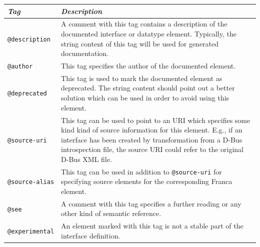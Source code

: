 \documentclass[a4paper,10pt]{scrreprt}
\newlength{\XdocTEffectiveWidth}
\begin{document}
\begin{table}
\setlength{\XdocTEffectiveWidth}{\textwidth}
\addtolength{\XdocTEffectiveWidth}{-4.0\tabcolsep}
\noindent\begin{tabular}{p{0.22\XdocTEffectiveWidth}p{0.78\XdocTEffectiveWidth}}
\toprule
\textit{Tag}

 & \textit{Description}

\\
\midrule
\protect\lstinline[language=Franca]�@description�

 & A comment with this tag contains a description of the documented
		   interface or datatype element.
		   Typically, the string content of this tag will be used for generated
		   documentation.

\\
\protect\lstinline[language=Franca]�@author�

 & This tag specifies the author of the documented element.

\\
\protect\lstinline[language=Franca]�@deprecated�

 & This tag is used to mark the documented element as deprecated.
		   The string content should point out a better solution which
		   can be used in order to avoid using this element.

\\
\protect\lstinline[language=Franca]�@source-uri�

 & This tag can be used to point to an URI which specifies some kind
		   kind of source information for this element. E.g., if an interface
		   has been created by transformation from a D-Bus introspection file,
		   the source URI could refer to the original D-Bus XML file.

\\
\protect\lstinline[language=Franca]�@source-alias�

 & This tag can be used in addition to \protect\lstinline[language=Franca]�@source-uri� for
		   specifying source elements for the corresponding Franca element.

\\
\protect\lstinline[language=Franca]�@see�

 & A comment with this tag specifies a further reading or any other
		   kind of semantic reference.

\\
\protect\lstinline[language=Franca]�@experimental�

 & An element marked with this tag is not a stable part of the 
		   interface definition.


\end{tabular}
\end{table}
\end{document}
